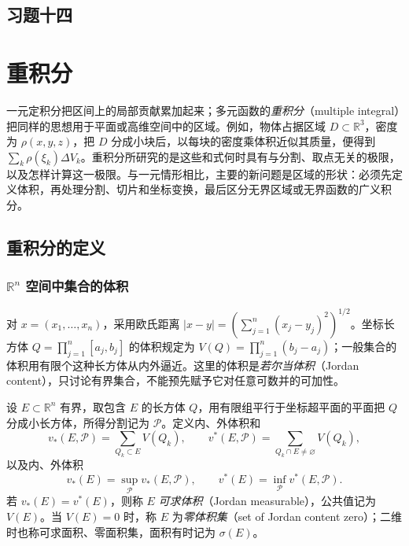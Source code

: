 \documentclass[UTF8,12pt,a4paper,fontset=fandol]{ctexbook}
\begin{document}
\section*{习题十四}

\chapter{重积分}
\label{chap:multiple-integrals}

一元定积分把区间上的局部贡献累加起来；多元函数的\emph{重积分}（multiple integral）把同样的思想用于平面或高维空间中的区域。例如，物体占据区域 $D\subset\mathbb R^3$，密度为 $\rho(x,y,z)$，把 $D$ 分成小块后，以每块的密度乘体积近似其质量，便得到 $\sum_k\rho(\xi_k)\Delta V_k$。重积分所研究的是这些和式何时具有与分割、取点无关的极限，以及怎样计算这一极限。与一元情形相比，主要的新问题是区域的形状：必须先定义体积，再处理分割、切片和坐标变换，最后区分无界区域或无界函数的广义积分。


\section{重积分的定义}
\label{sec:definition-of-multiple-integrals}

\subsection{\texorpdfstring{$\mathbb{R}^n$}{R^n} 空间中集合的体积}
\label{subsec:volumes-of-sets-in-euclidean-space}

对 $x=(x_1,\ldots,x_n)$，采用欧氏距离 $|x-y|=(\sum_{j=1}^n(x_j-y_j)^2)^{1/2}$。坐标长方体 $Q=\prod_{j=1}^n[a_j,b_j]$ 的体积规定为 $V(Q)=\prod_{j=1}^n(b_j-a_j)$；一般集合的体积用有限个这种长方体从内外逼近。这里的体积是\emph{若尔当体积}（Jordan content），只讨论有界集合，不能预先赋予它对任意可数并的可加性。

\begin{definition}
\label{def:multiple-jordan-volume}
设 $E\subset\mathbb R^n$ 有界，取包含 $E$ 的长方体 $Q$，用有限组平行于坐标超平面的平面把 $Q$ 分成小长方体，所得分割记为 $\mathcal P$。定义内、外体积和
\[
    v_*(E,\mathcal P)=\sum_{Q_k\subset E}V(Q_k),\qquad
    v^*(E,\mathcal P)=\sum_{Q_k\cap E\ne\varnothing}V(Q_k),
\]
以及内、外体积
\[
    v_*(E)=\sup_{\mathcal P}v_*(E,\mathcal P),\qquad
    v^*(E)=\inf_{\mathcal P}v^*(E,\mathcal P).
\]
若 $v_*(E)=v^*(E)$，则称 $E$ \emph{可求体积}（Jordan measurable），公共值记为 $V(E)$。当 $V(E)=0$ 时，称 $E$ 为\emph{零体积集}（set of Jordan content zero）；二维时也称可求面积、零面积集，面积有时记为 $\sigma(E)$。
\end{definition}
\end{document}
